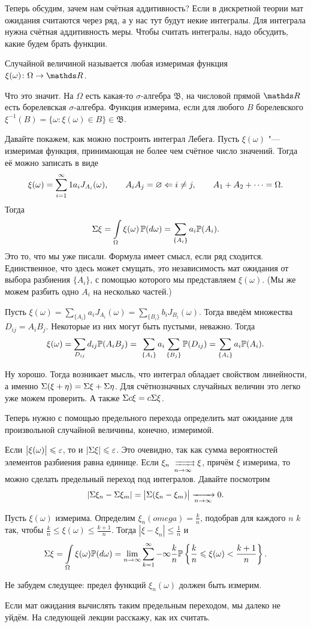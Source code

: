Теперь обсудим, зачем нам счётная аддитивность? Если в дискретной теории мат ожидания считаются через ряд, а у нас тут будут некие интегралы. Для интеграла нужна счётная аддитивность меры. Чтобы считать интегралы, надо обсудить, какие будем брать функции.

\begin{Def}
  Случайной величиной называется любая измеримая функция $\xi(\omega)\colon \Omega\to \R$.
\end{Def}
Что это значит. На $\Omega$ есть какая-то $\sigma$-алгебра $\mathfrak B$, на числовой прямой $\R$ есть борелевская $\sigma$-алгебра. Функция измерима, если для любого $B$ борелевского $\xi^{-1}(B) = \big\{\omega\colon \xi(\omega)\in B\big\}\in\mathfrak B$.

Давайте покажем, как можно построить интеграл Лебега.
Пусть $\xi(\omega)$ "--- измеримая функция, принимающая не более чем счётное число значений. Тогда её можно записать в виде
\[
  \xi(\omega) = \rY i1 a_i J_{A_i}(\omega),\qquad
  A_i A_j = \q \Leftarrow i\ne j,\qquad
  A_1+A_2+\dots = \Omega.
\]
Тогда
\[  
  \E\xi = \int\limits_\Omega \xi(\omega)\,\P(d\omega) = \sum\limits_{\{A_i\}} a_i \P(A_i).
\]
Это то, что мы уже писали. Формула имеет смысл, если ряд сходится. Единственное, что здесь может смущать, это независимость мат ожидания от выбора разбиения $\{A_i\}$, с помощью которого мы представляем $\xi(\omega)$. (Мы же можем разбить одно $A_i$ на несколько частей.)

Пусть $\xi(\omega) = \sum\limits_{\{A_i\}} a_i J_{A_i}(\omega) = \sum\limits_{\{B_i\}}b_i J_{B_i}(\omega)$. Тогда введём множества $D_{ij} = A_i B_j$. Некоторые из них могут быть пустыми, неважно. Тогда
\[
  \xi(\omega) = \sum\limits_{D_{ij}} d_{ij} \P(A_iB_j) = \
 \sum\limits_{\{A_i\}} a_i \sum\limits_{\{B_j\}} \P(D_{ij}) = \sum\limits_{\{A_i\}} a_i \P(A_i).
\]

Ну хорошо. Тогда возникает мысль, что интеграл обладает свойством линейности, а именно $\E(\xi +\eta) = \E\xi + \E\eta$. Для счётнозначных случайных величин это легко уже можем проверить. А также $\E c\xi = c\E\xi$.

Теперь нужно с помощью предельного перехода определить мат ожидание для произвольной случайной величины, конечно, измеримой.

Если $\big|\xi(\omega)\big|\le \e$, то и $|\E\xi|\le \e$. Это очевидно, так как сумма вероятностей элементов разбиения равна единице. Если $\xi_n\rsh[] n \xi$, причём $\xi$ измерима, то можно сделать предельный переход под интегралов. Давайте посмотрим
\[
  |\E\xi_n - \E\xi_m| = \big|\E(\xi_n-\xi_m)\big|\te 0.
\]

Пусть $\xi(\omega)$ измерима. Определим $\xi_n(omega) = \frac {k}n$, подобрав для каждого $n$ $k$ так, чтобы $\frac kn\le \xi(\omega)\le \frac{k+1}n$. Тогда $|\xi - \xi_n| \le \frac1n$ и
\[
  \E\xi = \int\limits_\Omega \xi(\omega) \P(d\omega) = \lim\limits_{n\to\infty} \rY k{-\infty} \frac kn \P\left\{\frac kn\le\xi(\omega)< \frac{k+1}n\right\}.
\]

Не забудем следущее: предел функций $\xi_n(\omega)$ должен быть измерим.

Если мат ожидания вычислять таким предельным переходом, мы далеко не уйдём. На следующей лекции расскажу, как их считать.